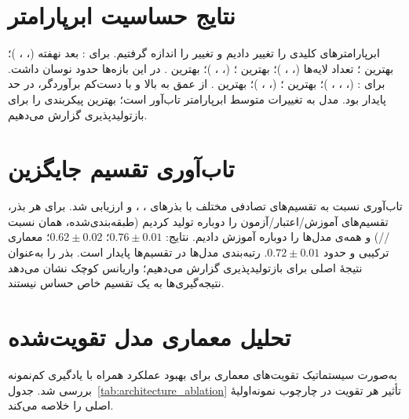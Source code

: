 \section{نتایج حساسیت ابرپارامتر}

ابرپارامترهای کلیدی را تغییر دادیم و تغییر  را اندازه گرفتیم. برای : بعد نهفته (، ، )؛ بهترین ؛ تعداد لایه‌ها (، ، )؛ بهترین ؛  (، ، )؛ بهترین .  در این بازه‌ها حدود  نوسان داشت. برای : \texttt{} (، ، ، )؛ بهترین ؛ \texttt{} (، ، )؛ بهترین .  از عمق  به بالا و با دست‌کم  برآوردگر، در حد  پایدار بود. مدل به تغییرات متوسط ابرپارامتر تاب‌آور است؛ بهترین پیکربندی را برای بازتولیدپذیری گزارش می‌دهیم.

\section{تاب‌آوری تقسیم جایگزین}

تاب‌آوری نسبت به تقسیم‌های تصادفی مختلف با بذرهای ، ، و  ارزیابی شد. برای هر بذر، تقسیم‌های آموزش/اعتبار/آزمون را دوباره تولید کردیم (طبقه‌بندی‌شده، همان نسبت //) و همه‌ی مدل‌ها را دوباره آموزش دادیم. نتایج:   $0.76 \pm 0.01$؛  $0.62 \pm 0.02$؛ معماری ترکیبی  و  حدود $0.72 \pm 0.01$. رتبه‌بندی مدل‌ها در تقسیم‌ها پایدار است. بذر  را به‌عنوان نتیجۀ اصلی برای بازتولیدپذیری گزارش می‌دهیم؛ واریانس کوچک نشان می‌دهد نتیجه‌گیری‌ها به یک تقسیم خاص حساس نیستند.

\section{تحلیل معماری مدل تقویت‌شده}

به‌صورت سیستماتیک تقویت‌های معماری برای بهبود عملکرد  همراه با یادگیری کم‌نمونه بررسی شد. جدول~\ref{tab:architecture_ablation} تأثیر هر تقویت در چارچوب نمونه‌اولیۀ اصلی را خلاصه می‌کند.

